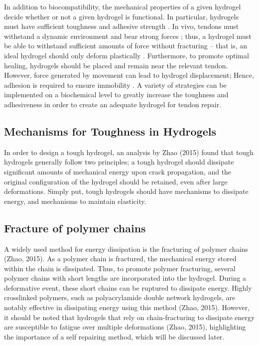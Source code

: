 In addition to biocompatibility, the mechanical properties of a given hydrogel decide whether or not a given hydrogel is functional. In particular, hydrogels must have sufficient toughness and adhesive strength \autocite{freedmanEnhancedTendonHealing2022}. In vivo, tendons must withstand a dynamic environment and bear strong forces \autocite{ChenAdvancesApplicationHydrogel}; thus, a hydrogel must be able to withstand sufficient amounts of force without fracturing – that is, an ideal hydrogel should only deform plastically \autocite{freedmanEnhancedTendonHealing2022}. Furthermore, to promote optimal healing, hydrogels should be placed and remain near the relevant tendon. However, force generated by movement can lead to hydrogel displacement; Hence, adhesion is required to ensure immobility \autocite{freedmanEnhancedTendonHealing2022}. A variety of strategies can be implemented on a biochemical level to greatly increase the toughness and adhesiveness in order to create an adequate hydrogel for tendon repair.

\subsection{Mechanisms for Toughness in Hydrogels}
In order to design a tough hydrogel, an analysis by Zhao (2015) found that tough hydrogels generally follow two principles; a tough hydrogel should dissipate significant amounts of mechanical energy upon crack propagation, and the original configuration of the hydrogel should be retained, even after large deformations. Simply put, tough hydrogels should have mechanisms to dissipate energy, and mechanisms to maintain elasticity. 

\subsection{Fracture of polymer chains}
A widely used method for energy dissipation is the fracturing of polymer chains (Zhao, 2015). As a polymer chain is fractured, the mechanical energy stored within the chain is dissipated. Thus, to promote polymer fracturing, several polymer chains with short lengths are incorporated into the hydrogel. During a deformative event, these short chains can be ruptured to dissipate energy. Highly crosslinked polymers, such as polyacrylamide double network hydrogels, are notably effective in dissipating energy using this method (Zhao, 2015). However, it should be noted that hydrogels that rely on chain-fracturing to dissipate energy are susceptible to fatigue over multiple deformations (Zhao, 2015), highlighting the importance of a self repairing method, which will be discussed later.

